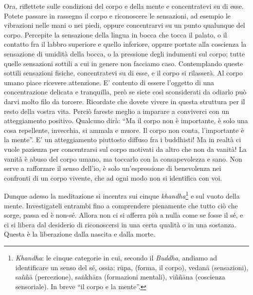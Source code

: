 Ora, riflettete sulle condizioni del corpo e della mente e concentratevi
su di esse. Potete passare in rassegna il corpo e riconoscere le
sensazioni, ad esempio le vibrazioni nelle mani o nei piedi, oppure
concentrarvi su un punto qualunque del corpo. Percepite la sensazione
della lingua in bocca che tocca il palato, o il contatto fra il labbro
superiore e quello inferiore, oppure portate alla coscienza la
sensazione di umidità della bocca, o la pressione degli indumenti sul
corpo; tutte quelle sensazioni sottili a cui in genere non facciamo
caso. Contemplando queste sottili sensazioni fisiche, concentratevi su
di esse, e il corpo si rilasserà. Al corpo umano piace ricevere
attenzione. E' contento di essere l'oggetto di una concentrazione
delicata e tranquilla, però se siete così sconsiderati da odiarlo può
darvi molto filo da torcere. Ricordate che dovete vivere in questa
struttura per il resto della vostra vita. Perciò fareste meglio a
imparare a conviverci con un atteggiamento positivo. Qualcuno dirà: ``Ma
il corpo non è importante, è solo una cosa repellente, invecchia, si
ammala e muore. Il corpo non conta, l'importante è la mente''. E' un
atteggiamento piuttosto diffuso fra i buddhisti! Ma in realtà ci vuole
pazienza per concentrarsi sul corpo motivati da altro che non da vanità!
La vanità è abuso del corpo umano, ma toccarlo con la consapevolezza e
sano. Non serve a rafforzare il senso dell'io, è solo un'espressione di
benevolenza nei confronti di un corpo vivente, che ad ogni modo non si
identifica con voi.

Dunque adesso la meditazione si incentra sui cinque \textit{khandha}\footnote{\textit{Khandha}: le cinque categorie in cui, secondo il \textit{Buddha},
andiamo ad identificare un senso del sé, ossia: rūpa, (forma, il corpo),
vedanā (sensazioni), saññā (percezione), saṅkhāra (formazioni mentali),
viññāna (coscienza sensoriale). In breve ``il corpo e la mente”.} e
sul vuoto della mente. Investigateli entrambi fino a comprendere
pienamente che tutto ciò che sorge, passa ed è non-sé. Allora non ci si
afferra più a nulla come se fosse il sé, e ci si libera dal desiderio di
riconoscersi in una certa qualità o in una sostanza. Questa è la
liberazione dalla nascita e dalla morte.

